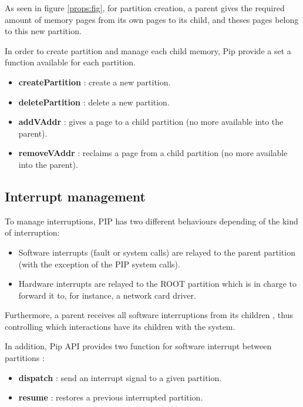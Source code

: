 \documentclass[conference]{IEEEtran}
\begin{document}
As seen in figure \ref{props:fig}, for partition creation, a parent gives the required amount of memory pages from its own pages to its child, and theses pages belong to this new partition.

In order to create partition and manage each child memory, Pip provide a set a function available for each partition.
\begin{itemize}
	\item \textbf{createPartition} : create a new partition.
	\item \textbf{deletePartition} : delete a new partition.
	\item \textbf{addVAddr} : gives a page to a child partition (no more available into the parent).
	\item \textbf{removeVAddr} : reclaims a page from a child partition (no more available into the parent).
\end{itemize}


\subsection{Interrupt management}
To manage interruptions, PIP has two different behaviours depending of the kind of interruption:
\begin{itemize}
	\item Software interrupts (fault or system calls) are relayed to the parent partition (with the exception of the PIP system calls).
	\item Hardware interrupts are relayed to the ROOT partition which is in charge to forward it to, for instance, a network card driver.
\end{itemize}

Furthermore, a parent receives all software interruptions from its children%
, thus controlling which interactions have its children with the system.

In addition, Pip API provides two function for software interrupt between partitions :
\begin{itemize}
	\item \textbf{dispatch} : send an interrupt signal to a given partition.
	\item \textbf{resume} : restores a previous interrupted partition.
\end{itemize}
\end{document}
